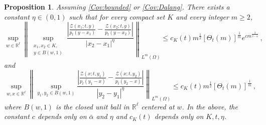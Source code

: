 \documentclass[12pt,reqno]{amsart}
\newtheorem{proposition}[theorem]{Proposition}
\theoremstyle{remark}
\newcommand{\1}{\mathbf{1}}
\def\RR{\mathbb{R}}
\def\Z{\mathcal{Z}}
\def\lt{\left}
\def\rt{\right}
\begin{document}
	\begin{proposition}\label{prop:hder} Assuming \ref{Cov:bounded} or \ref{Cov:Dalang}. There exists a constant $\eta\in(0,1)$ such that for every compact set $K$ and every integer $m\ge2$, 
	\begin{equation}\label{eqn:hder}
		\sup_{w\in\RR^\ell} \lt\|\sup_{\substack{x_1,x_2\in K,\\ y\in B(w,1)}}
		\frac{\lt|\frac{\Z(x_1;t,y)}{p_t(y-x_1)}-\frac{\Z(x_2;t,y)}{p_t(y-x_2)}\rt|}{|x_2-x_1|^{\eta}} \rt\|_{L^m(\Omega)}\le c_K(t) m^{\frac12}[\Theta_t(m)]^{\frac1m}e^{cm^{\frac{2}{2-\bar{\alpha}}}}\,,
	\end{equation} 
	and
	\begin{equation}\label{eqn:hder y}
		\sup_{w, x\in\RR^\ell} \lt\|\sup_{ y_1,y_2\in B(w,1)}
		\frac{\lt|\frac{\Z(x;t,y_1)}{p_t(y_1-x)}-\frac{\Z(x;t,y_2)}{p_t(y_2-x)}\rt|}{|y_2-y_1|^{\eta}} \rt\|_{L^m(\Omega)}\le c_K(t) m^{\frac12}[\Theta_t(m)]^{\frac1m}\,,
	\end{equation} 	
	where $B(w,1)$ is the closed unit ball in $\RR^\ell$ centered at $w$. 
	In the above, the constant $c$ depends only on $\bar{\alpha}$ and $\eta$ and $c_K(t)$ depends only on $K,t, \eta$.
	\end{proposition}
\end{document}
